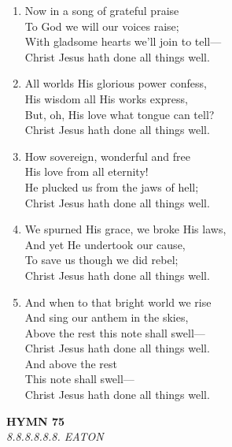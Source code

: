 \begin{enumerate}
    \item Now in a song of grateful praise \\
        To God we will our voices raise; \\
        With gladsome hearts we'll join to tell--- \\
        Christ Jesus hath done all things well.

    \item All worlds His glorious power confess, \\
        His wisdom all His works express, \\
        But, oh, His love what tongue can tell? \\
        Christ Jesus hath done all things well.

    \item How sovereign, wonderful and free \\
        His love from all eternity! \\
        He plucked us from the jaws of hell; \\
        Christ Jesus hath done all things well.

    \item We spurned His grace, we broke His laws, \\
        And yet He undertook our cause, \\
        To save us though we did rebel; \\
        Christ Jesus hath done all things well.

    \item And when to that bright world we rise \\
        And sing our anthem in the skies, \\
        Above the rest this note shall swell--- \\
        Christ Jesus hath done all things well. \\
        And above the rest \\
        This note shall swell--- \\
        Christ Jesus hath done all things well.

\end{enumerate}

\newpage
\begin{center}
    {\Large \textbf{HYMN 75}}
    \\
    \textit{8.8.8.8.8.8. EATON}
\end{center}
\vspace{1em}

